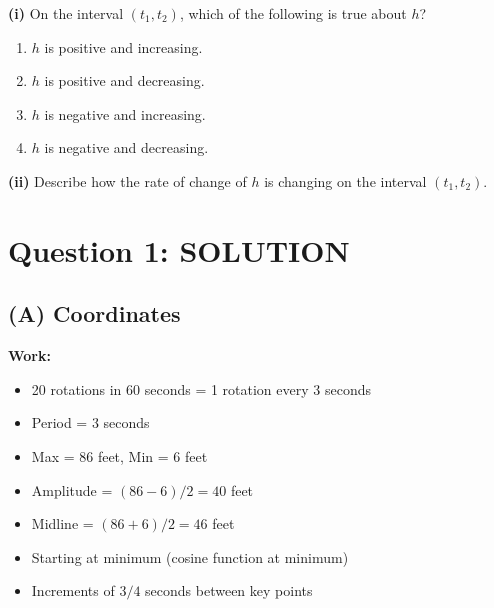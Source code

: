 \documentclass[11pt]{article}
\begin{document}
\textbf{(i)} On the interval $(t_1, t_2)$, which of the following is true about $h$?

\begin{enumerate}[label=\alph*., leftmargin=1.5cm]
    \item $h$ is positive and increasing.
    \item $h$ is positive and decreasing.
    \item $h$ is negative and increasing.
    \item $h$ is negative and decreasing.
\end{enumerate}

\vspace{0.5cm}
\textbf{(ii)} Describe how the rate of change of $h$ is changing on the interval $(t_1, t_2)$.

\newpage

\section*{Question 1: SOLUTION}

\subsection*{(A) Coordinates}

\textbf{Work:}
\begin{itemize}[noitemsep]
    \item 20 rotations in 60 seconds = 1 rotation every 3 seconds
    \item Period = 3 seconds
    \item Max = 86 feet, Min = 6 feet
    \item Amplitude = $(86 - 6)/2 = 40$ feet
    \item Midline = $(86 + 6)/2 = 46$ feet
    \item Starting at minimum (cosine function at minimum)
    \item Increments of $3/4$ seconds between key points
\end{itemize}

\begin{center}
\end{center}
\end{document}
